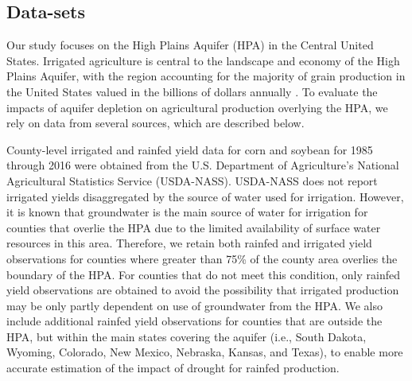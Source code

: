 \documentclass[
]{article}
\begin{document}
\hypertarget{methods-data}{%
\subsection{Data-sets}\label{methods-data}}

Our study focuses on the High Plains Aquifer (HPA) in the Central United States. Irrigated agriculture is central to the landscape and economy of the High Plains Aquifer, with the region accounting for the majority of grain production in the United States valued in the billions of dollars annually \citep{fenichel2016measuring,smidt2016complex}. To evaluate the impacts of aquifer depletion on agricultural production overlying the HPA, we rely on data from several sources, which are described below. 

County-level irrigated and rainfed yield data for corn and soybean for 1985 through 2016 were obtained from the U.S. Department of Agriculture's National Agricultural Statistics Service (USDA-NASS). USDA-NASS does not report irrigated yields disaggregated by the source of water used for irrigation. However, it is known that groundwater is the main source of water for irrigation for counties that overlie the HPA due to the limited availability of surface water resources in this area. Therefore, we retain both rainfed and irrigated yield observations for counties where greater than 75\% of the county area overlies the boundary of the HPA. For counties that do not meet this condition, only rainfed yield observations are obtained to avoid the possibility that irrigated production may be only partly dependent on use of groundwater from the HPA. We also include additional rainfed yield observations for counties that are outside the HPA, but within the main states covering the aquifer (i.e., South Dakota, Wyoming, Colorado, New Mexico, Nebraska, Kansas, and Texas), to enable more accurate estimation of the impact of drought for rainfed production. 
\end{document}
